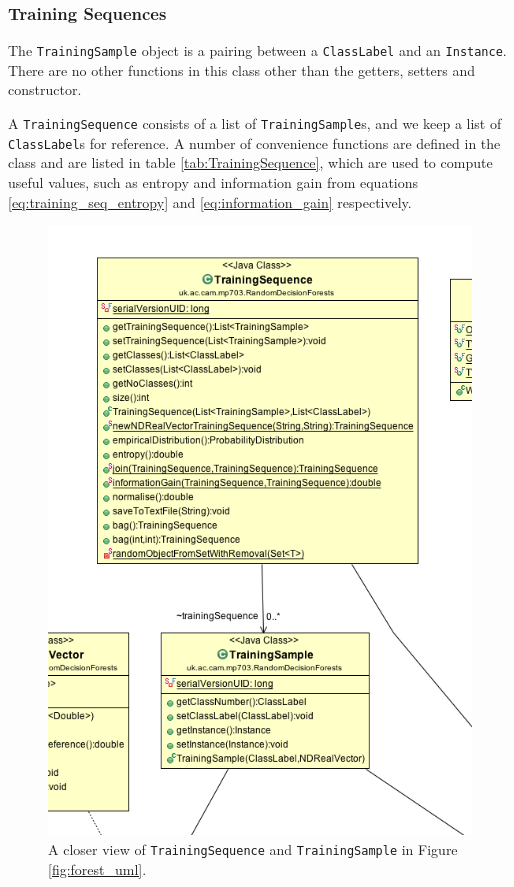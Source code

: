 \documentclass[12pt,twoside,notitlepage]{report}
\begin{document}
            \subsubsection{Training Sequences}
                The \texttt{TrainingSample} object is a pairing between a \texttt{ClassLabel} and an 
                \texttt{Instance}. There are no other functions in this class other than the getters, setters and 
                constructor. 

                A \texttt{TrainingSequence} consists of a list of \texttt{TrainingSample}s, and we keep a list of 
                \texttt{ClassLabel}s for reference. A number of convenience functions are defined in the class and 
                are listed in table \ref{tab:TrainingSequence}, which are used to compute useful values, such as
                entropy and information gain from equations \ref{eq:training_seq_entropy} and \ref{eq:information_gain} 
                respectively.

                \begin{figure}[H]
                    \centering
                    \includegraphics[scale=0.5]{TrainingSequence_Forest_UML}
                    \caption[A closer view of \texttt{TrainingSequence} and \texttt{TrainingSample}]{A closer view of \texttt{TrainingSequence} and \texttt{TrainingSample} in Figure \ref{fig:forest_uml}.}
                    \label{fig:training_seq_uml}
                \end{figure}
\end{document}
